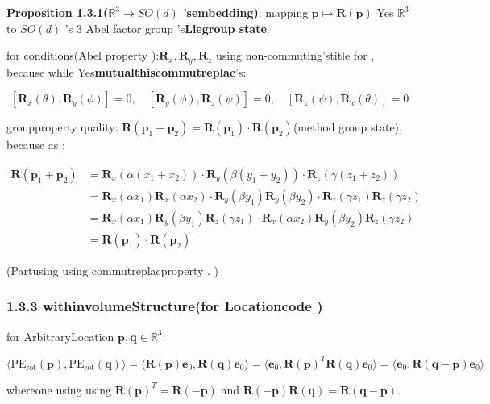 \documentclass[
  12pt,
]{article}
\begin{document}
\textbf{Proposition 1.3.1(\(\mathbb{R}^3 \to SO(d)\) 'sembedding)}: mapping
\(\mathbf{p} \mapsto \mathbf{R}(\mathbf{p})\) Yes \(\mathbb{R}^3\) to 
\(SO(d)\) 's \(3\)  Abel factor group 's\textbf{Liegroup state}. 

for conditions(Abel property ):\(\mathbf{R}_x, \mathbf{R}_y, \mathbf{R}_z\)
using non-commuting'stitle for , because while Yes\textbf{mutualthiscommutreplac}'s: 

\[[\mathbf{R}_x(\theta), \mathbf{R}_y(\phi)] = 0, \quad [\mathbf{R}_y(\phi), \mathbf{R}_z(\psi)] = 0, \quad [\mathbf{R}_z(\psi), \mathbf{R}_x(\theta)] = 0\]

groupproperty quality: \(\mathbf{R}(\mathbf{p}_1 + \mathbf{p}_2) = \mathbf{R}(\mathbf{p}_1) \cdot \mathbf{R}(\mathbf{p}_2)\)(method group state), because as : 

\begin{align*}
\mathbf{R}(\mathbf{p}_1 + \mathbf{p}_2) &= \mathbf{R}_x(\alpha(x_1 + x_2)) \cdot \mathbf{R}_y(\beta(y_1 + y_2)) \cdot \mathbf{R}_z(\gamma(z_1 + z_2)) \\
&= \mathbf{R}_x(\alpha x_1)\mathbf{R}_x(\alpha x_2) \cdot \mathbf{R}_y(\beta y_1)\mathbf{R}_y(\beta y_2) \cdot \mathbf{R}_z(\gamma z_1)\mathbf{R}_z(\gamma z_2) \\
&= \mathbf{R}_x(\alpha x_1)\mathbf{R}_y(\beta y_1)\mathbf{R}_z(\gamma z_1) \cdot \mathbf{R}_x(\alpha x_2)\mathbf{R}_y(\beta y_2)\mathbf{R}_z(\gamma z_2) \\
&= \mathbf{R}(\mathbf{p}_1) \cdot \mathbf{R}(\mathbf{p}_2)
\end{align*}

(Partusing using commutreplacproperty . )

\subsubsection{1.3.3
withinvolumeStructure(for Locationcode )}\label{ux5185ux79efux7ed3ux6784ux76f8ux5bf9ux4f4dux7f6eux7f16ux7801}

for ArbitraryLocation \(\mathbf{p}, \mathbf{q} \in \mathbb{R}^3\): 

\[\boxed{\langle \text{PE}_{\text{rot}}(\mathbf{p}), \text{PE}_{\text{rot}}(\mathbf{q}) \rangle = \langle \mathbf{R}(\mathbf{p})\mathbf{e}_0, \mathbf{R}(\mathbf{q})\mathbf{e}_0 \rangle = \langle \mathbf{e}_0, \mathbf{R}(\mathbf{p})^T \mathbf{R}(\mathbf{q}) \mathbf{e}_0 \rangle = \langle \mathbf{e}_0, \mathbf{R}(\mathbf{q} - \mathbf{p}) \mathbf{e}_0 \rangle}\]

whereone using using 
\(\mathbf{R}(\mathbf{p})^T = \mathbf{R}(-\mathbf{p})\) and 
\(\mathbf{R}(-\mathbf{p})\mathbf{R}(\mathbf{q}) = \mathbf{R}(\mathbf{q} - \mathbf{p})\). 
\end{document}
